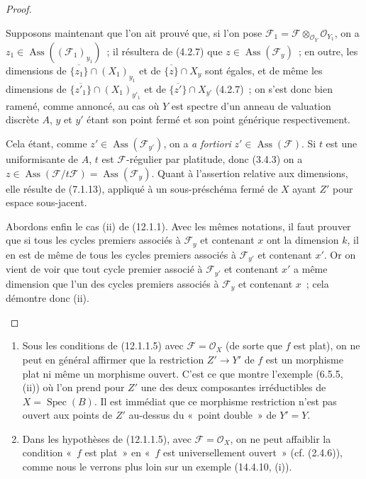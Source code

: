 \begin{proof}
\begin{env}[12.1.1.4]
Supposons maintenant que l'on ait prouvé que, si l'on pose
$\mathcal F_1=\mathcal F\otimes_{\mathcal O_Y}\mathcal O_{Y_1}$, on a
$z_1\in\operatorname{Ass}((\mathcal F_1)_{y_1})$~; il résultera de (4.2.7) que
$z\in\operatorname{Ass}(\mathcal F_y)$~; en outre, les dimensions de
$\overline{\{z_1\}}\cap(X_1)_{y_1}$ et de $\overline{\{z\}}\cap X_y$ sont
égales, et de même les dimensions de
$\overline{\{z'_1\}}\cap(X_1)_{y'_1}$ et de
$\overline{\{z'\}}\cap X_{y'}$ (4.2.7)~; on s'est donc bien ramené, comme
annoncé, au cas où $Y$ est spectre d'un anneau de valuation discrète $A$, $y$
et $y'$ étant son point fermé et son point générique respectivement.

Cela étant, comme $z'\in\operatorname{Ass}(\mathcal F_{y'})$, on a
\emph{a fortiori} $z'\in\operatorname{Ass}(\mathcal F)$. Si $t$ est une
uniformisante de $A$, $t$ est $\mathcal F$-régulier par platitude, donc (3.4.3)
on a $z\in\operatorname{Ass}(\mathcal F/t\mathcal F)
=\operatorname{Ass}(\mathcal F_y)$. Quant à l'assertion relative aux
dimensions, elle résulte de (7.1.13), appliqué à un sous-préschéma fermé de $X$
ayant $Z'$ pour espace sous-jacent.

Abordons enfin le cas (ii) de (12.1.1). Avec les mêmes notations, il faut
prouver que si tous les cycles premiers associés à $\mathcal F_y$ et contenant
$x$ ont la dimension $k$, il en est de même de tous les cycles premiers
associés à $\mathcal F_{y'}$ et contenant $x'$. Or on vient de voir que tout
cycle premier associé à $\mathcal F_{y'}$ et contenant $x'$ a même dimension
que l'un des cycles premiers associés à $\mathcal F_y$ et contenant $x$~; cela
démontre donc (ii).
\end{env}
\end{proof}

\begin{remarks}[12.1.2]
\begin{enumerate}[label=(\roman*)]
  \item Sous les conditions de (12.1.1.5) avec $\mathcal F=\mathcal O_X$ (de
  sorte que $f$ est plat), on ne peut en général affirmer que la restriction
  $Z'\to Y'$ de $f$ est un morphisme plat ni même un morphisme ouvert. C'est ce
  que montre l'exemple (6.5.5,
  (ii)) où l'on prend pour $Z'$ une des deux composantes irréductibles de
  $X=\operatorname{Spec}(B)$. Il est immédiat que ce morphisme restriction
  n'est pas ouvert aux points de $Z'$ au-dessus du «~point double~» de $Y'=Y$.
  \item Dans les hypothèses de (12.1.1.5), avec
  $\mathcal F=\mathcal O_X$, on ne peut affaiblir la condition «~$f$ est
  plat~» en «~$f$ est universellement ouvert~» (cf. (2.4.6)), comme nous le
  verrons plus loin sur un exemple (14.4.10, (i)).
\end{enumerate}
\end{remarks}

